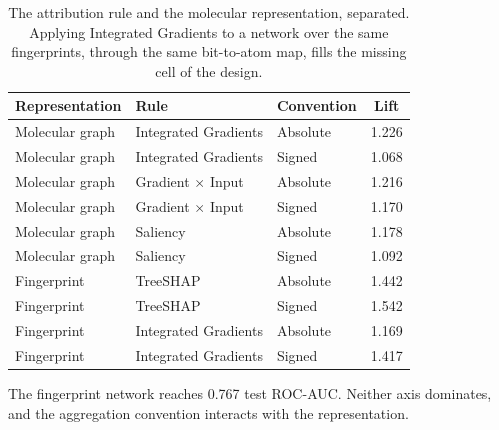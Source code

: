 \begin{table}[htbp]
\centering
\caption{The attribution rule and the molecular representation, separated. Applying Integrated Gradients to a network over the same fingerprints, through the same bit-to-atom map, fills the missing cell of the design.}
\label{tab:si_2x2}
\small
\setlength{\tabcolsep}{4pt}
\begin{tabular}{lllc}
\toprule
Representation & Rule & Convention & Lift \\
\midrule
Molecular graph & Integrated Gradients & Absolute & 1.226 \\
Molecular graph & Integrated Gradients & Signed & 1.068 \\
Molecular graph & Gradient $\times$ Input & Absolute & 1.216 \\
Molecular graph & Gradient $\times$ Input & Signed & 1.170 \\
Molecular graph & Saliency & Absolute & 1.178 \\
Molecular graph & Saliency & Signed & 1.092 \\
Fingerprint & TreeSHAP & Absolute & 1.442 \\
Fingerprint & TreeSHAP & Signed & 1.542 \\
Fingerprint & Integrated Gradients & Absolute & 1.169 \\
Fingerprint & Integrated Gradients & Signed & 1.417 \\
\bottomrule
\end{tabular}
\begin{flushleft}\footnotesize The fingerprint network reaches 0.767 test ROC-AUC. Neither axis dominates, and the aggregation convention interacts with the representation.\end{flushleft}
\end{table}
